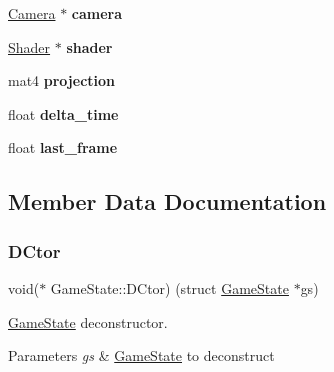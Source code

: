 \begin{DoxyCompactItemize}
\begin{tabbing}
\end{tabbing}\item 
\mbox{\label{struct_game_state_a8ddae28369420fae557c1db3cdc8870c}} 
\mbox{\hyperlink{struct_camera}{Camera}} $\ast$ {\bfseries camera}
\item 
\mbox{\label{struct_game_state_a47a772081fc93399b3882b960d91b8d5}} 
\mbox{\hyperlink{struct_shader}{Shader}} $\ast$ {\bfseries shader}
\item 
\mbox{\label{struct_game_state_a980c860e9616d865ff075e127b0b40e7}} 
mat4 {\bfseries projection}
\item 
\mbox{\label{struct_game_state_a1ddfa0f7b675e77c620a59eecece16c9}} 
float {\bfseries delta\+\_\+time}
\item 
\mbox{\label{struct_game_state_adec36ecb14a36c91561df5f14f58251f}} 
float {\bfseries last\+\_\+frame}
\end{DoxyCompactItemize}


\subsection{Member Data Documentation}
\mbox{\label{struct_game_state_a89ac5d517616efa61dc4542b99ddca55}} 
\subsubsection{\texorpdfstring{DCtor}{DCtor}}
{\footnotesize\ttfamily void($\ast$ Game\+State\+::\+D\+Ctor) (struct \mbox{\hyperlink{struct_game_state}{Game\+State}} $\ast$gs)}



\mbox{\hyperlink{struct_game_state}{Game\+State}} deconstructor. 


\begin{DoxyParams}{Parameters}
{\em gs} & \mbox{\hyperlink{struct_game_state}{Game\+State}} to deconstruct \\
\hline
\end{DoxyParams}
\mbox{\label{struct_game_state_af9b81ae9492dd446bec0fd03db6b302a}} 
